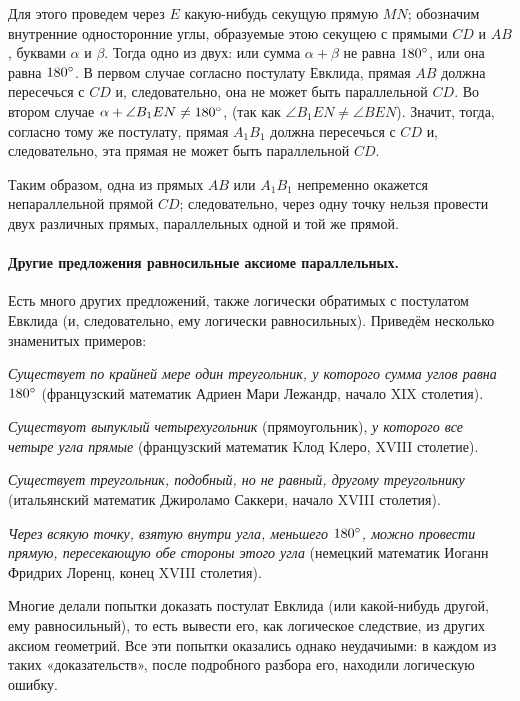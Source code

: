 \documentclass[twoside]{book}
\begin{document}
Для этого проведем через $E$ какую-нибудь секущую прямую $MN$;
обозначим внутренние односторонние углы, образуемые этою секущею
с прямыми $CD$ и $AB$, буквами $\alpha$ и $\beta$.
Тогда одно из двух: или сумма $\alpha+\beta$ не равна $180\degree$,
или она равна $180\degree$.
В первом случае согласно постулату Евклида,
прямая $AB$ должна пересечься с $CD$ и, следовательно, она не может быть параллельной $CD$. 
Во втором случае $\alpha+\angle B_1EN\ne 180\degree$, (так как $\angle B_1EN\ne \angle BEN$).
Значит, тогда, согласно тому же постулату, прямая $A_1B_1$ должна пересечься
с $CD$ и, следовательно, эта прямая не может быть параллельной
$CD$.

Таким образом, одна из прямых $AB$ или $A_1B_1$ непременно окажется непараллельной прямой $CD$; следовательно, через одну точку нельзя провести двух различных прямых, параллельных одной и той же прямой.

\paragraph{Другие предложения равносильные аксиоме параллельных.}\label{1914/92}
Есть много других предложений, также логически обратимых с постулатом Евклида (и, следовательно, ему логически равносильных).
Приведём несколько знаменитых примеров:

\emph{Существует по крайней мере один треугольник, у которого сумма углов равна $180\degree$} (французский математик Адриен Мари Лежандр, начало XIX столетия).

\emph{Существуот выпуклый четырехугольник} (прямоугольник), \emph{у которого все четыре угла прямые} (французский математик Kлод  Kлеро, XVIII столетие).

\emph{Существует треугольник, подобный, но не равный, другому треугольнику} (итальянский математик Джироламо Саккери, начало XVIII столетия).

\emph{Через всякую точку, взятую внутри угла, меньшего $180\degree$, можно
провести прямую, пересекающую обе стороны этого угла} (немецкий
математик Иоганн Фридрих Лоренц, конец XVIII столетия).

{\sloppy

Многие делали попытки доказать постулат Евклида
(или какой-нибудь другой, ему равносильный), то есть вывести его,
как логическое следствие, из других аксиом геометрий.
Все эти попытки оказались однако неудачиыми: в каждом из таких «доказательств», после подробного разбора его, находили логическую ошибку.

}
\end{document}
